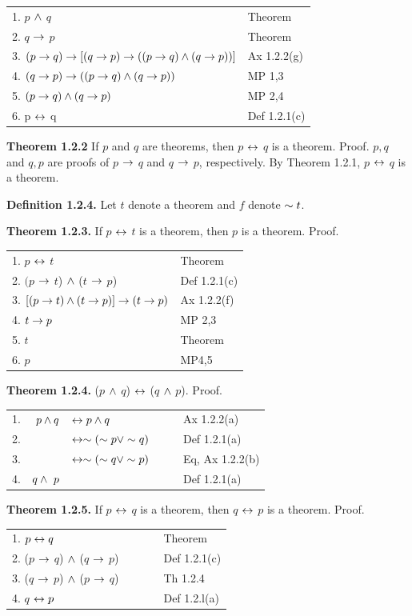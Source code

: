 \begin{large}
\begin{tabular}{ l l }
1. $p$ $\wedge$ $q$ & Theorem \\
2. $q$ $\to$ $p$ & Theorem \\
3. $(p \to q) \to [(q \to p) \to ((p \to q) \wedge (q \to p))]$ & Ax 1.2.2(g) \\
4. $(q \to p) \to ( (p \to q)  \wedge (q \to p))$ & MP 1,3 \\
5. $(p \to q) \wedge (q \to p)$ & MP 2,4 \\
6.  p $\leftrightarrow$ q & Def 1.2.1(c) \\
\end{tabular}
\fl \textbf{Theorem 1.2.2} If $p$ and $q$ are theorems, then $p$ $\leftrightarrow$ $q$ is a theorem. \nl
 Proof. $p ,q$ and $q ,p$ are proofs of $p$ $\to$ $q$ and $q$ $\to$ $p$, respectively.
 By Theorem 1.2.1, $p$ $\leftrightarrow$ $q$ is a theorem. \nl

\fl \textbf{Definition 1.2.4.} Let $t$ denote a theorem and $f$ denote $\sim t$. \nl

\fl \textbf{Theorem 1.2.3.} If $p$ $\leftrightarrow$ $t$ is a theorem, then $p$ is a theorem. Proof. \nl
\begin{tabular}{l l}
1. $p$ $\leftrightarrow$ $t$ & Theorem  \\
2. $(p$ $\to$ $t$) $\wedge$ ($t$ $\to$ $p$) & Def 1.2.1(c)\\
3. $[(p \to t) \wedge (t \to p)] \to ( t \to p)$ & Ax 1.2.2(f)  \\
4. $t \to p$ & MP 2,3  \\
5. $t$ & Theorem \\
6. $p$ & MP4,5 \\
\end{tabular}
\fl \textbf{Theorem 1.2.4.} ($p$ $\wedge$ $q$) $\leftrightarrow$ ($q$ $\wedge$ $p$). Proof.
\begin{tabular}{l r l l l l}
1.& $p \wedge q$  &$\leftrightarrow p \wedge q$ &&&Ax 1.2.2(a)\\
2.    &&$\leftrightarrow \sim (\sim p \lor \sim q)$ &$ $&$ $& Def 1.2.1(a)\\
3.    &&$\leftrightarrow \sim (\sim q \lor \sim p)$ &$ $&$ $& Eq, Ax 1.2.2(b)\\
4.     &$q \up \ p$ &$ $&$ $&& Def 1.2.1(a)\\
\end{tabular}
\newpage
\fl \textbf{Theorem 1.2.5.} If $p$ $\leftrightarrow$ $q$ is a theorem, then $q$ $\leftrightarrow$ $p$ is a theorem. Proof. \nl
\begin{tabular}{ l l l l}
1. $p \leftrightarrow q$ &&&Theorem \\
2. ($p$ $\to$ $q$)  $\wedge$ ($q$ $\to$ $p$) &$\quad $&$ $& Def 1.2.1(c) \\
3. ($q$ $\to$ $p$) $\wedge$  ($p$ $\to$ $q$) &$ $&$ $& Th 1.2.4  \\
4. $q$ $\leftrightarrow p$  &$ $&$ $& Def 1.2.l(a) \\
\end{tabular}\\


\end{large}
